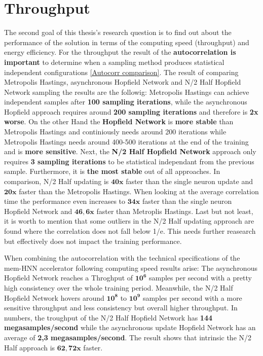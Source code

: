 \section{Throughput}

The second goal of this thesis's research question is to find out about the performance of the solution in terms of the 
computing speed (throughput) and energy efficiency. 
For the throughput the result of the \textbf{autocorrelation is important} to determine when a sampling method produces statistical independent configurations \ref{Autocorr comparison}.
The result of comparing Metropolis Hastings, asynchronous Hopfield Network and N/2 Half Hopfield Network sampling the results are the followig:
Metropolis Hastings can achieve independent samples after \textbf{100 sampling iterations}, while the asynchronous Hopfield approach requires around \textbf{200 sampling iterations} and therefore 
is \textbf{2x worse}. On the other Hand the \textbf{Hopfield Network} is \textbf{more stable} than Metropolis Hastings and continiously needs around 200 iterations 
while Metropolis Hastings needs around 400-500 iterations at the end of the training and is \textbf{more sensitive}. 
Next, the \textbf{N/2 Half Hopfield Network} approach only requires \textbf{3 sampling iterations} to be statistical independant from the previous sample.
Furthermore, it is \textbf{the most stable} out of all approaches. In comparison, N/2 Half updating is \(\mathbf{40x}\) faster than the single neuron
update and \(\mathbf{20x}\) faster than the Metropolis Hastings. 
When looking at the average correlation time the performance even increases to \(\mathbf{34x}\) faster than the single neuron Hopfield Network and \(\mathbf{46,6x}\)
faster than Metroplis Hastings.
Last but not least, it is worth to mention that some outliers in the N/2 Half updating approach are found where 
the correlation does not fall below 1/e. This needs further reasearch but effectively does not impact the training performance. 

When combining the autocorrelation with the technical specifications of the \ac{mem-HNN} accelerator following computing speed results arise:
The asynchronous Hopfield Network reaches a Throghput of \(\mathbf{10^6}\) samples per second with a pretty high
consistency over the whole training period. Meanwhile, the N/2 Half Hopfield Network 
hovers around \(\mathbf{10^8}\) to \(\mathbf{10^9}\) samples per second with a more sensitive throughput and less consistency 
but overall higher throughput.
In numbers, the troughput of the N/2 Half Hopfield Network has \textbf{144 megasamples/second} while the asynchronous update Hopfield Network has an average of \textbf{2,3 megasamples/second}.
The result shows that intrinsic the N/2 Half approach is \(\mathbf{62,72x}\) faster. 

